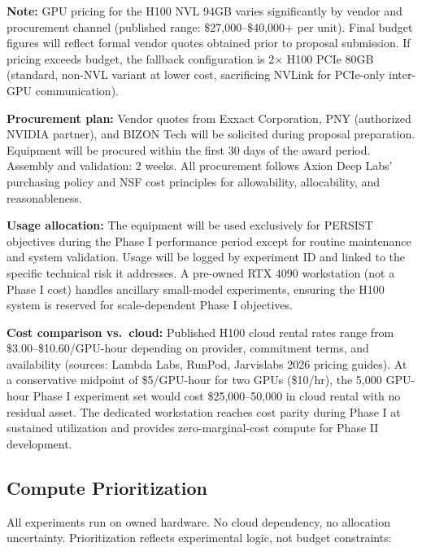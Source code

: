 \documentclass[11pt,letterpaper]{article}
\begin{document}
\textbf{Note:} GPU pricing for the H100 NVL 94GB varies significantly by vendor and procurement channel (published range: \$27,000--\$40,000+ per unit). Final budget figures will reflect formal vendor quotes obtained prior to proposal submission. If pricing exceeds budget, the fallback configuration is 2$\times$ H100 PCIe 80GB (standard, non-NVL variant at lower cost, sacrificing NVLink for PCIe-only inter-GPU communication).

\textbf{Procurement plan:} Vendor quotes from Exxact Corporation, PNY (authorized NVIDIA partner), and BIZON Tech will be solicited during proposal preparation. Equipment will be procured within the first 30 days of the award period. Assembly and validation: 2 weeks. All procurement follows Axion Deep Labs' purchasing policy and NSF cost principles for allowability, allocability, and reasonableness.

\textbf{Usage allocation:} The equipment will be used exclusively for PERSIST objectives during the Phase I performance period except for routine maintenance and system validation. Usage will be logged by experiment ID and linked to the specific technical risk it addresses. A pre-owned RTX 4090 workstation (not a Phase I cost) handles ancillary small-model experiments, ensuring the H100 system is reserved for scale-dependent Phase I objectives.

\textbf{Cost comparison vs.\ cloud:} Published H100 cloud rental rates range from \$3.00--\$10.60/GPU-hour depending on provider, commitment terms, and availability (sources: Lambda Labs, RunPod, Jarvislabs 2026 pricing guides). At a conservative midpoint of \$5/GPU-hour for two GPUs (\$10/hr), the 5,000 GPU-hour Phase I experiment set would cost \$25,000--50,000 in cloud rental with no residual asset. The dedicated workstation reaches cost parity during Phase I at sustained utilization and provides zero-marginal-cost compute for Phase II development.

\subsection{Compute Prioritization}

All experiments run on owned hardware. No cloud dependency, no allocation uncertainty. Prioritization reflects experimental logic, not budget constraints:
\end{document}
